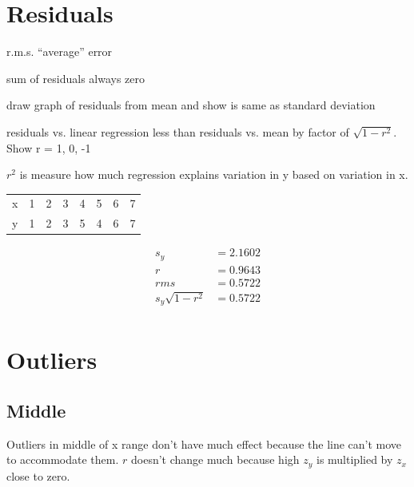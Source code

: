 \documentclass[landscape]{exam}
\begin{document}
  \section{Residuals}

  \begin{itemize*}
    \item r.m.s. ``average'' error
    \item sum of residuals always zero
    \item draw graph of residuals from mean and show is same as standard deviation
    \item residuals vs. linear regression less than residuals vs. mean by factor of
      $\sqrt{1- r^2}$.  Show r = 1, 0, -1

    \item $r^2$ is measure how much regression explains variation in y based on
      variation in x.

  \end{itemize*}

  \begin{table}[H]
    \centering
    \begin{tabular}{r|rrrrrrr}
      \toprule
      x & 1 & 2 & 3 & 4 & 5 & 6 & 7 \\ 
      y & 1 & 2 & 3 & 5 & 4 & 6 & 7 \\ 
     \bottomrule
    \end{tabular}
  \end{table}

  \begin{align*}
    s_y                & = 2.1602 \\
    r                  & = 0.9643 \\
    rms                & = 0.5722 \\
    s_y \sqrt{1 - r^2} & = 0.5722 \\
  \end{align*}


  \section{Outliers}

  \subsection{Middle}

  Outliers in middle of x range don't have much effect because the line can't move to
  accommodate them.  $r$ doesn't change much because high $z_y$ is multiplied by
  $z_x$ close to zero.
\end{document}

